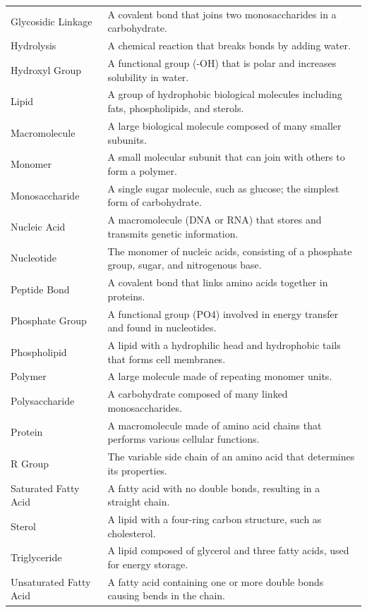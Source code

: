 \documentclass[
  letterpaper,
  DIV=11,
  numbers=noendperiod]{scrreprt}
\begin{document}
{\begin{longtable}[]{@{}
  >{\raggedright\arraybackslash}p{}
  >{\raggedright\arraybackslash}p{}@{}}
Glycosidic Linkage & A covalent bond that joins two monosaccharides in a
carbohydrate. \\
Hydrolysis & A chemical reaction that breaks bonds by adding water. \\
Hydroxyl Group & A functional group (-OH) that is polar and increases
solubility in water. \\
Lipid & A group of hydrophobic biological molecules including fats,
phospholipids, and sterols. \\
Macromolecule & A large biological molecule composed of many smaller
subunits. \\
Monomer & A small molecular subunit that can join with others to form a
polymer. \\
Monosaccharide & A single sugar molecule, such as glucose; the simplest
form of carbohydrate. \\
Nucleic Acid & A macromolecule (DNA or RNA) that stores and transmits
genetic information. \\
Nucleotide & The monomer of nucleic acids, consisting of a phosphate
group, sugar, and nitrogenous base. \\
Peptide Bond & A covalent bond that links amino acids together in
proteins. \\
Phosphate Group & A functional group (PO4) involved in energy transfer
and found in nucleotides. \\
Phospholipid & A lipid with a hydrophilic head and hydrophobic tails
that forms cell membranes. \\
Polymer & A large molecule made of repeating monomer units. \\
Polysaccharide & A carbohydrate composed of many linked
monosaccharides. \\
Protein & A macromolecule made of amino acid chains that performs
various cellular functions. \\
R Group & The variable side chain of an amino acid that determines its
properties. \\
Saturated Fatty Acid & A fatty acid with no double bonds, resulting in a
straight chain. \\
Sterol & A lipid with a four-ring carbon structure, such as
cholesterol. \\
Triglyceride & A lipid composed of glycerol and three fatty acids, used
for energy storage. \\
Unsaturated Fatty Acid & A fatty acid containing one or more double
bonds causing bends in the chain. \\
\end{longtable}
}
\end{document}
